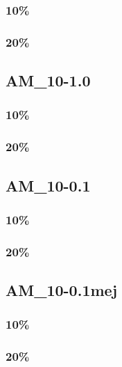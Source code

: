 \subsubsection{10\%}
\subsubsection{20\%}

\subsection{AM\_10-1.0}
\subsubsection{10\%}
\subsubsection{20\%}

\subsection{AM\_10-0.1}
\subsubsection{10\%}
\subsubsection{20\%}

\subsection{AM\_10-0.1mej}
\subsubsection{10\%}
\subsubsection{20\%}
